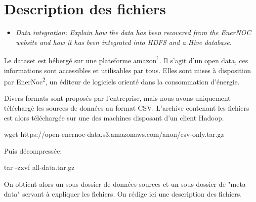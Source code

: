 \section{Description des fichiers}

\begin{itemize}
  \item \emph{Data integration: Explain how the data has been recovered from the EnerNOC website and  how it has been integrated into HDFS and a Hive database.}
\end{itemize}

{\let\thefootnote\relax{}
}
{\let\thefootnote\relax{}
}
{\let\thefootnote\relax{}
}
{\let\thefootnote\relax{}
}

\par Le dataset est hébergé sur une plateforme amazon\textsuperscript{1}. Il s'agit d'un open data, ces informations sont accessibles et utilisables par tous. Elles sont mises à disposition par EnerNoc\textsuperscript{2}, un éditeur de logiciels orienté dans la consommation d'énergie. 
\par Divers formats sont proposés par l'entreprise, mais nous avons uniquement téléchargé les sources de données au format CSV.  L'archive contenant les fichiers est alors téléchargée sur une des machines disposant d'un client Hadoop. 

\begin{unix}{wget https://open-enernoc-data.s3.amazonaws.com/anon/csv-only.tar.gz}\end{unix}

Puis décompressée:

\begin{unix}{tar -zxvf all-data.tar.gz}\end{unix}

\par On obtient alors un sous dossier de données sources et un sous dossier de "meta data"  servant à expliquer les fichiers. On rédige ici une description des fichiers.

